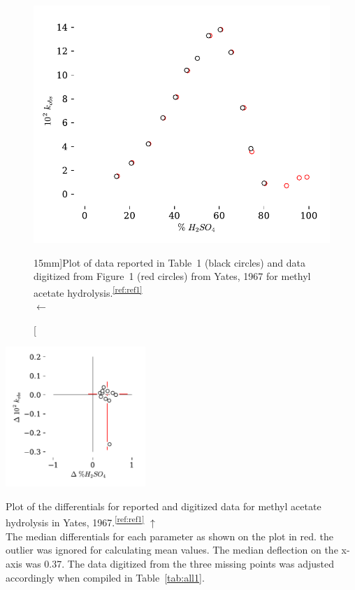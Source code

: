 \documentclass[]{tufte-handout}
\newcommand{\tss}[1]{\textsuperscript{#1}}
\begin{document}
\begin{figure}[h!]
\vspace{15mm}
  \centering
  \includegraphics[scale=0.7]{images/plot1}
  \caption[][15mm]{Plot of data reported in Table~1 (black circles) and data digitized from Figure~1 (red circles) from Yates, 1967 for methyl acetate hydrolysis.\tss{\ref{ref:ref1}}   \\  $\longleftarrow$ \vspace{3mm}}
  \label{fig:fig2}
\end{figure}

\begin{marginfigure}[-60mm]
  \centering
  \includegraphics[width=150pt]{images/plot2}
  \caption[0mm]{Plot of the differentials for reported and digitized data for methyl acetate hydrolysis in Yates, 1967.\tss{\ref{ref:ref1}} $\uparrow$ \\ The median differentials for each parameter as shown on the plot in red. the outlier was ignored for calculating mean values. The median deflection on the x-axis was 0.37. The data digitized from the three missing points was adjusted accordingly when compiled in Table~\vref{tab:all1}.\vspace{3mm}}
  \label{fig:fig3}
\end{marginfigure}
\end{document}
